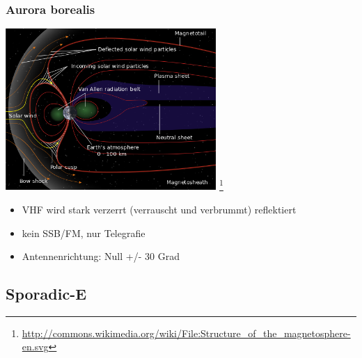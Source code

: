 \begin{frame}
    \frametitle{Aurora borealis}

    \begin{center}
        \includegraphics[width=0.6\textwidth]{bv11/Structure_of_the_magnetosphere-en.png}
        \footnote{\tiny \url{http://commons.wikimedia.org/wiki/File:Structure_of_the_magnetosphere-en.svg}}
    \end{center}

    \begin{itemize}
        \item VHF wird stark verzerrt (verrauscht und verbrummt) reflektiert
        \item kein SSB/FM, nur Telegrafie
        \item Antennenrichtung: Null +/- 30 Grad
    \end{itemize}

\end{frame}

\subsection{Sporadic-E}

